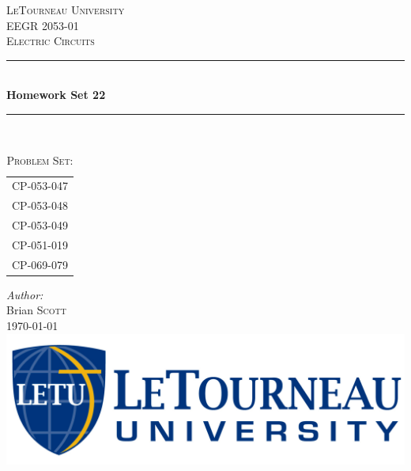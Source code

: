 \begin{titlepage}
\newcommand{\HRule}{\rule{\linewidth}{0.4mm}} 
\center
\textsc{\LARGE LeTourneau University}\\[1.5cm]
\textsc{\Large EEGR 2053-01}\\[0.5cm]
\textsc{\large Electric Circuits}\\[0.5cm]
\HRule \\[0.4cm]
{ \huge \bfseries Homework Set 22}\\[0.2cm]
\HRule \\[1.5cm]
\begin{table}[h]
\large
\ttfamily
\centering
\caption*{\textsc{\large Problem Set:}}
\label{tab:probset}
\begin{tabular}{l}
CP-053-047 \\
CP-053-048 \\
CP-053-049 \\
CP-051-019 \\
CP-069-079 \\[1.5cm]
\end{tabular}
\end{table}
\Large \emph{Author:}\\
Brian \textsc{Scott}\\[1cm]
{\large \datef\today}
\vfill
\includegraphics[scale=0.20]{gfx/logoHoriz.jpg}\\[1cm] 
\end{titlepage}